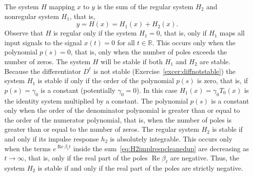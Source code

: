 \documentclass[11pt,a4paper]{book}
\theoremstyle{plain}
\numberwithin{equation}{section}
\newcommand{\reals}{{\mathbb R}}
\renewcommand{\Re}{\operatorname{Re}}
\renewcommand{\Im}{\operatorname{Im}}
\newcommand{\abs}[1]{\left\vert #1 \right\vert}
\begin{document}

The system $H$ mapping $x$ to $y$ is the sum of the regular system $H_2$ and nonregular system $H_1$, that is,
\[
y = H(x) = H_1(x) + H_2(x).
\] 
Observe that $H$ is regular only if the system $H_1 = 0$, that is, only if $H_1$ maps all input signals to the signal $x(t) = 0$ for all $t \in \reals$.  This occurs only when the polynomial $p(s) = 0$, that is, only when the number of poles exceeds the number of zeros.  The system $H$ will be stable if both $H_1$ and $H_2$ are stable.  Because the differentiator $D^\ell$ is not stable (Exercise~\ref{excer:diffnotstable}) the system $H_1$ is stable if only if the order of the polynomial $p(s)$ is zero, that is, if $p(s) = \gamma_0$ is a constant (potentially $\gamma_0 = 0$).  In this case $H_1(x) = \gamma_0 T_0(x)$ is the identity system multiplied by a constant.  The polynomial $p(s)$ is a constant only when the order of the denominator polynomial is greater than or equal to the order of the numerator polynomial, that is, when the number of poles is greater than or equal to the number of zeros.  The regular system $H_2$ is stable if and only if its impulse response $h_2$ is absolutely integrable.  This occurs only when the terms $e^{\Re{\beta_\ell} t}$ inside the sum~\eqref{eq:H2implrespcleanedup} are decreasing as $t \rightarrow \infty$, that is, only if the real part of the poles $\Re{\beta_\ell}$ are negative.  Thus, the system $H_2$ is stable if and only if the real part of the poles are strictly negative.
\end{document}
